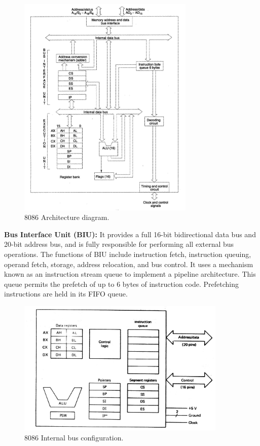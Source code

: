 \documentclass[12pt, a4paper]{scrartcl}
\begin{document}
	\begin{figure}[h]
		\centering
		\includegraphics[width=0.75\textwidth]{images/8086-architecture.png}
		\caption{8086 Architecture diagram.}
		\label{image-1}
	\end{figure}
	
	\textbf{Bus Interface Unit (BIU): }It provides a full 16-bit bidirectional data bus and 20-bit address bus, and is fully responsible for performing all external bus operations. The functions of BIU include instruction fetch, instruction queuing, operand fetch, storage, address relocation, and bus control. It uses a mechanism known as an instruction stream queue to implement a pipeline architecture. This queue permits the prefetch of up to 6 bytes of instruction code. Prefetching instructions are held in its FIFO queue.
	
	\begin{figure}[h]
		\centering
		\includegraphics[width=0.89\textwidth]{images/8086-internal-bus-configuration.png}
		\caption{8086 Internal bus configuration.}
		\label{image-2}
	\end{figure}
	
\end{document}
